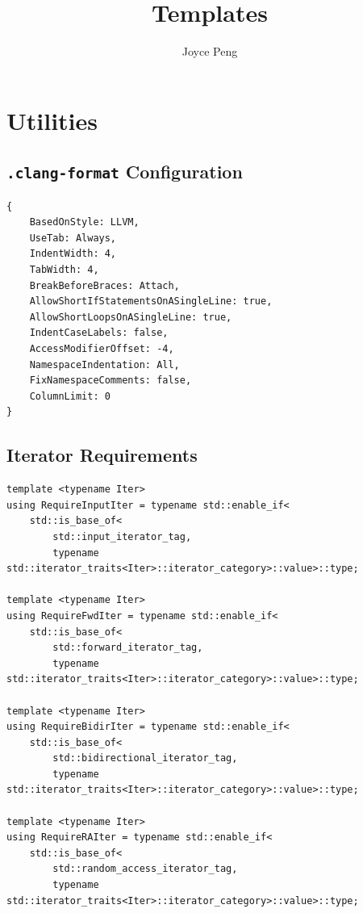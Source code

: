 \documentclass[UTF8]{article}
\title{Templates}
\author{Joyce Peng}
\begin{document}
\newif\ifprelim
\prelimtrue
\pagestyle{fancy}
\fancyhf{}
\fancyfoot[C]{\ifprelim 0\else\thepage\fi}
\fancypagestyle{plain}{%
	\fancyhf{}%
	\fancyfoot[C]{\ifprelim 0\else\thepage\fi}%
	\renewcommand{\headrulewidth}{0pt}%
	\renewcommand{\footrulewidth}{0pt}%
}

\maketitle
\tableofcontents
\clearpage
\prelimfalse
\setcounter{page}{1}

\section{Utilities}
\subsection{\texttt{.clang-format} Configuration}
\begin{verbatim}
{
	BasedOnStyle: LLVM,
	UseTab: Always,
	IndentWidth: 4,
	TabWidth: 4,
	BreakBeforeBraces: Attach,
	AllowShortIfStatementsOnASingleLine: true,
	AllowShortLoopsOnASingleLine: true,
	IndentCaseLabels: false,
	AccessModifierOffset: -4,
	NamespaceIndentation: All,
	FixNamespaceComments: false,
	ColumnLimit: 0
}
\end{verbatim}

\subsection{Iterator Requirements}
\begin{verbatim}
template <typename Iter>
using RequireInputIter = typename std::enable_if<
	std::is_base_of<
		std::input_iterator_tag,
		typename std::iterator_traits<Iter>::iterator_category>::value>::type;

template <typename Iter>
using RequireFwdIter = typename std::enable_if<
	std::is_base_of<
		std::forward_iterator_tag,
		typename std::iterator_traits<Iter>::iterator_category>::value>::type;

template <typename Iter>
using RequireBidirIter = typename std::enable_if<
	std::is_base_of<
		std::bidirectional_iterator_tag,
		typename std::iterator_traits<Iter>::iterator_category>::value>::type;

template <typename Iter>
using RequireRAIter = typename std::enable_if<
	std::is_base_of<
		std::random_access_iterator_tag,
		typename std::iterator_traits<Iter>::iterator_category>::value>::type;
\end{verbatim}
\end{document}
